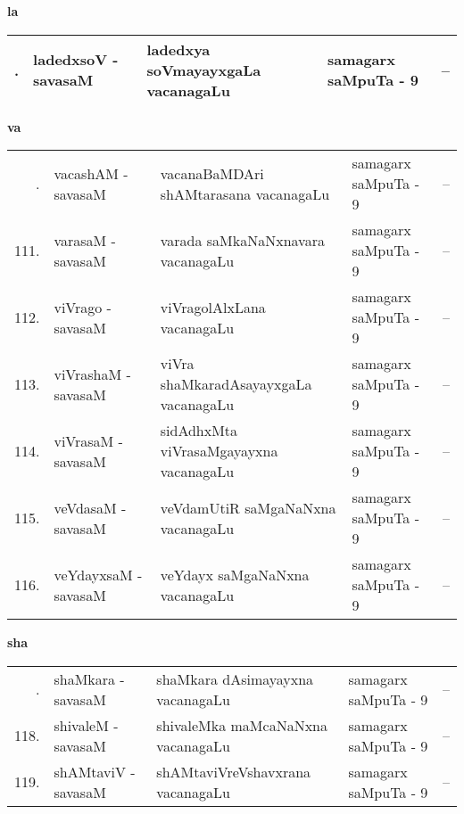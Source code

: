 \medskip

\centerline{\bf la}

{\renewcommand{\arraystretch}{1.3}
\begin{longtable}{rl>{\raggedright}p{5.5cm}lc}
\hline
\endfirsthead
\hline
\endhead
\hline
\endfoot
\endlastfoot
109. &  ladedxsoV - savasaM &  ladedxya soVmayayxgaLa vacanagaLu & samagarx saMpuTa - 9 & --\\
\hline
\end{longtable}}
\smallskip

\centerline{\bf va}

{\renewcommand{\arraystretch}{1.3}
\begin{longtable}{rl>{\raggedright}p{5.5cm}lc}
\hline
\endfirsthead
\hline
\endhead
\hline
\endfoot
\endlastfoot
110. &  vacashAM - savasaM & vacanaBaMDAri shAMtarasana vacanagaLu & samagarx saMpuTa - 9 & --\\
111. &  varasaM - savasaM &  varada saMkaNaNxnavara vacanagaLu & samagarx saMpuTa - 9 & --\\
112. &  viVrago - savasaM &  viVragolAlxLana vacanagaLu & samagarx saMpuTa - 9 & --\\
113. & viVrashaM - savasaM &  viVra shaMkaradAsayayxgaLa vacanagaLu & samagarx saMpuTa - 9 & --\\
114. & viVrasaM - savasaM & sidAdhxMta viVrasaMgayayxna vacanagaLu & samagarx saMpuTa - 9 & --\\
115. & veVdasaM - savasaM &  veVdamUtiR saMgaNaNxna vacanagaLu & samagarx saMpuTa - 9 & --\\
116. & veYdayxsaM - savasaM &  veYdayx saMgaNaNxna vacanagaLu & samagarx saMpuTa - 9 & --\\
\hline
\end{longtable}}
\smallskip

\centerline{\bf sha}

{\renewcommand{\arraystretch}{1.3}
\begin{longtable}{rl>{\raggedright}p{5.5cm}lc}
\hline
\endfirsthead
\hline
\endhead
\hline
\endfoot
\endlastfoot
117. & shaMkara - savasaM &  shaMkara dAsimayayxna vacanagaLu & samagarx saMpuTa - 9 & --\\
118. & shivaleM - savasaM &  shivaleMka maMcaNaNxna vacanagaLu & samagarx saMpuTa - 9 & --\\
119. & shAMtaviV - savasaM & shAMtaviVreVshavxrana vacanagaLu & samagarx saMpuTa - 9 & --\\
\hline
\end{longtable}}
\smallskip

